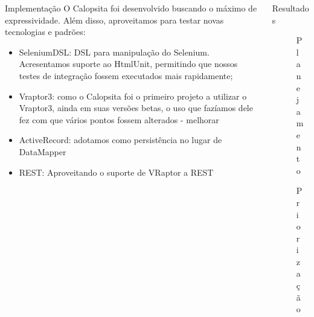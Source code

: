 \documentclass[serif,mathserif,final]{beamer}
\newcommand{\calopsita}{Calopsita}
\begin{document}
\begin{frame}{}
\begin{columns}[t]
\begin{column}{0.32\linewidth}
			\begin{block}{Implementação}
				O \calopsita{} foi desenvolvido buscando o máximo de expressividade. Além disso, aproveitamos
				para testar novas tecnologias e padrões:
				
				\begin{itemize}
					\item{SeleniumDSL: DSL para manipulação do Selenium. Acresentamos suporte ao HtmlUnit, permitindo
					que nossos testes de integração fossem executados mais rapidamente;}
					\item{Vraptor3: como o \calopsita{} foi o primeiro projeto a utilizar o Vraptor3, ainda em suas
					versões betas, o uso que fazíamos dele fez com que vários pontos fossem alterados - melhorar}
					\item{ActiveRecord: adotamos como persistência no lugar de DataMapper}
					\item{REST: Aproveitando o suporte de VRaptor a REST}
				\end{itemize}
      \end{block}

    \end{column}%

    \begin{column}{0.32\linewidth}

      \begin{block}{Resultados}
        \begin{figure}[htb]
         \centering
				\caption{Planejamento}
        \end{figure}
				
				\begin{figure}[htb]
         \centering
				\caption{Priorização}
        \end{figure}


\end{block}
\end{column}
\end{columns}
\end{frame}
\end{document}
